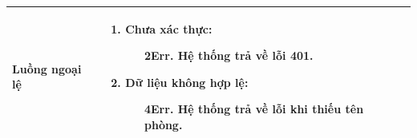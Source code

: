 {\begin{tabularx}{\textwidth}{|>{\raggedright\arraybackslash}X|>{\raggedright\arraybackslash}X|}
\hline
\textbf{Luồng ngoại lệ} &
\begin{enumerate}
    \item \textbf{Chưa xác thực:}
    \begin{enumerate}
        \item[2Err.] Hệ thống trả về lỗi 401.
    \end{enumerate}
    \item \textbf{Dữ liệu không hợp lệ:}
    \begin{enumerate}
        \item[4Err.] Hệ thống trả về lỗi khi thiếu tên phòng.
    \end{enumerate}
\end{enumerate} \\
\hline
\end{tabularx}
}
